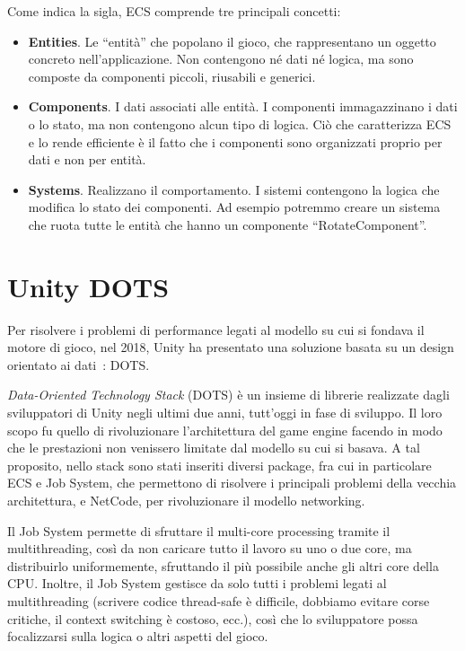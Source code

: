 Come indica la sigla, ECS comprende tre principali concetti:
\begin{itemize}
    \item \textbf{Entities}. Le ``entità'' che popolano il gioco, che rappresentano un oggetto concreto nell'applicazione. Non contengono né dati né logica, ma sono composte da componenti piccoli, riusabili e generici.
    \item \textbf{Components}. I dati associati alle entità. I componenti immagazzinano i dati o lo stato, ma non contengono alcun tipo di logica. Ciò che caratterizza ECS e lo rende efficiente è il fatto che i componenti sono organizzati proprio per dati e non per entità.
    \item \textbf{Systems}. Realizzano il comportamento. I sistemi contengono la logica che modifica lo stato dei componenti. Ad esempio potremmo creare un sistema che ruota tutte le entità che hanno un componente ``RotateComponent''.
\end{itemize}


\section{Unity DOTS}
Per risolvere i problemi di performance legati al modello su cui si fondava il motore di gioco, nel 2018, Unity ha presentato una soluzione basata su un design orientato ai dati~\cite{book:data-oriented-design}: DOTS.

\emph{Data-Oriented Technology Stack} (DOTS) è un insieme di librerie realizzate dagli sviluppatori di Unity negli ultimi due anni, tutt'oggi in fase di sviluppo. Il loro scopo fu quello di rivoluzionare l'architettura del game engine facendo in modo che le prestazioni non venissero limitate dal modello su cui si basava. A tal proposito, nello stack sono stati inseriti diversi package, fra cui in particolare ECS e Job System, che permettono di risolvere i principali problemi della vecchia architettura, e NetCode, per rivoluzionare il modello networking.

Il Job System permette di sfruttare il multi-core processing tramite il multithreading, così da non caricare tutto il lavoro su uno o due core, ma distribuirlo uniformemente, sfruttando il più possibile anche gli altri core della CPU. Inoltre, il Job System gestisce da solo tutti i problemi legati al multithreading (scrivere codice thread-safe è difficile, dobbiamo evitare corse critiche, il context switching è costoso, ecc.), così che lo sviluppatore possa focalizzarsi sulla logica o altri aspetti del gioco.


